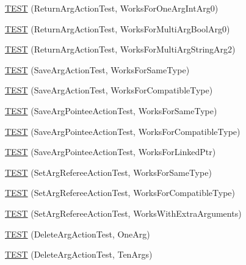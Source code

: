 \begin{DoxyCompactItemize}
\hyperlink{namespacetesting_1_1gmock__more__actions__test_a717ea38d7b78b6d51b4d617ed317d26e}{T\+E\+ST} (Return\+Arg\+Action\+Test, Works\+For\+One\+Arg\+Int\+Arg0)
\item 
\hyperlink{namespacetesting_1_1gmock__more__actions__test_a0705d7e6083d129caae9d91cc5d6d570}{T\+E\+ST} (Return\+Arg\+Action\+Test, Works\+For\+Multi\+Arg\+Bool\+Arg0)
\item 
\hyperlink{namespacetesting_1_1gmock__more__actions__test_ae280b3b95b0cdfcf7b81de95c8fe942d}{T\+E\+ST} (Return\+Arg\+Action\+Test, Works\+For\+Multi\+Arg\+String\+Arg2)
\item 
\hyperlink{namespacetesting_1_1gmock__more__actions__test_a511b9c6721629465fd1e2fbd65633ef9}{T\+E\+ST} (Save\+Arg\+Action\+Test, Works\+For\+Same\+Type)
\item 
\hyperlink{namespacetesting_1_1gmock__more__actions__test_a2b92b573de73fdf97dad4da8a67d7fc0}{T\+E\+ST} (Save\+Arg\+Action\+Test, Works\+For\+Compatible\+Type)
\item 
\hyperlink{namespacetesting_1_1gmock__more__actions__test_a51d471708cb6fa3c403ea1d936a49dc1}{T\+E\+ST} (Save\+Arg\+Pointee\+Action\+Test, Works\+For\+Same\+Type)
\item 
\hyperlink{namespacetesting_1_1gmock__more__actions__test_a35b74b32b6a222e048706e6ce8d64118}{T\+E\+ST} (Save\+Arg\+Pointee\+Action\+Test, Works\+For\+Compatible\+Type)
\item 
\hyperlink{namespacetesting_1_1gmock__more__actions__test_afc168d80fe8ca16f0efc874587574e64}{T\+E\+ST} (Save\+Arg\+Pointee\+Action\+Test, Works\+For\+Linked\+Ptr)
\item 
\hyperlink{namespacetesting_1_1gmock__more__actions__test_aa9fa575b30dca09e9886722b78415a22}{T\+E\+ST} (Set\+Arg\+Referee\+Action\+Test, Works\+For\+Same\+Type)
\item 
\hyperlink{namespacetesting_1_1gmock__more__actions__test_af5a15dbcba14010a5463f3ac9451ab8a}{T\+E\+ST} (Set\+Arg\+Referee\+Action\+Test, Works\+For\+Compatible\+Type)
\item 
\hyperlink{namespacetesting_1_1gmock__more__actions__test_a0ea4f3d8f1a643726e37825c58d8741f}{T\+E\+ST} (Set\+Arg\+Referee\+Action\+Test, Works\+With\+Extra\+Arguments)
\item 
\hyperlink{namespacetesting_1_1gmock__more__actions__test_a575e9a6f5bfcc133188e973147697425}{T\+E\+ST} (Delete\+Arg\+Action\+Test, One\+Arg)
\item 
\hyperlink{namespacetesting_1_1gmock__more__actions__test_a972b47a7e96b95606190afa928ea2db4}{T\+E\+ST} (Delete\+Arg\+Action\+Test, Ten\+Args)

\end{DoxyCompactItemize}
